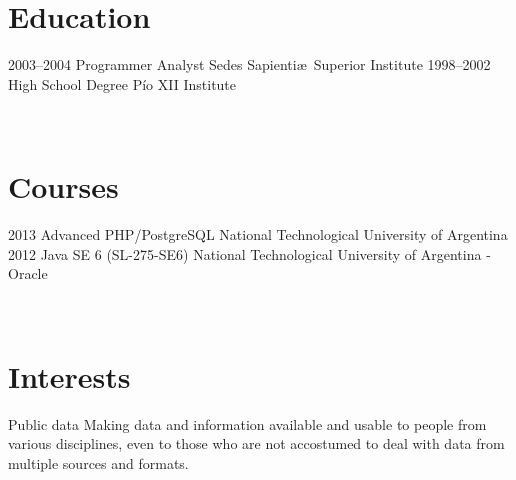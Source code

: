 \documentclass[]{cv-style}          %
\begin{document}
\section{Education}

\begin{entrylist}
\entry
{2003--2004}
{Programmer Analyst}
{Sedes Sapienti\ae\ Superior Institute}
{\vspace{-0.3cm}}
\entry
{1998--2002}
{High School Degree}
{Pío XII Institute}
{\vspace{-0.3cm}}

\end{entrylist}
\\
\section{Courses}

\begin{entrylist}
\entry
{2013}
{Advanced PHP/PostgreSQL}
{National Technological University of Argentina}
{\vspace{-0.3cm}}
\entry
{2012}
{Java SE 6 (SL-275-SE6)}
{National Technological University of Argentina - Oracle}
{\vspace{-0.3cm}}
\end{entrylist}
\\

\section{Interests}
\begin{entrylist}
\entry
{}
{Public data}
{}
{Making data and information available and usable to people from various disciplines, even to those who are not accostumed to deal with data from multiple sources and formats.}
{\vspace{-0.3cm}}
\end{entrylist}\
\\
\end{document}
